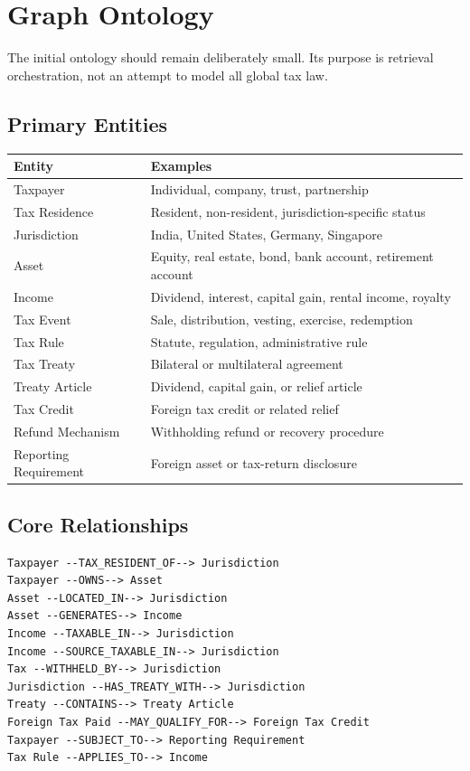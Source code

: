 \documentclass[11pt,a4paper]{article}
\begin{document}
\section{Graph Ontology}
The initial ontology should remain deliberately small. Its purpose is retrieval orchestration, not an attempt to model all global tax law.

\subsection{Primary Entities}
\begin{center}
\begin{tabular}{p{3.5cm}p{9cm}}\toprule
Entity & Examples\\\midrule
Taxpayer & Individual, company, trust, partnership\\
Tax Residence & Resident, non-resident, jurisdiction-specific status\\
Jurisdiction & India, United States, Germany, Singapore\\
Asset & Equity, real estate, bond, bank account, retirement account\\
Income & Dividend, interest, capital gain, rental income, royalty\\
Tax Event & Sale, distribution, vesting, exercise, redemption\\
Tax Rule & Statute, regulation, administrative rule\\
Tax Treaty & Bilateral or multilateral agreement\\
Treaty Article & Dividend, capital gain, or relief article\\
Tax Credit & Foreign tax credit or related relief\\
Refund Mechanism & Withholding refund or recovery procedure\\
Reporting Requirement & Foreign asset or tax-return disclosure\\\bottomrule
\end{tabular}
\end{center}

\subsection{Core Relationships}
\begin{lstlisting}
Taxpayer --TAX_RESIDENT_OF--> Jurisdiction
Taxpayer --OWNS--> Asset
Asset --LOCATED_IN--> Jurisdiction
Asset --GENERATES--> Income
Income --TAXABLE_IN--> Jurisdiction
Income --SOURCE_TAXABLE_IN--> Jurisdiction
Tax --WITHHELD_BY--> Jurisdiction
Jurisdiction --HAS_TREATY_WITH--> Jurisdiction
Treaty --CONTAINS--> Treaty Article
Foreign Tax Paid --MAY_QUALIFY_FOR--> Foreign Tax Credit
Taxpayer --SUBJECT_TO--> Reporting Requirement
Tax Rule --APPLIES_TO--> Income
\end{lstlisting}
\end{document}
